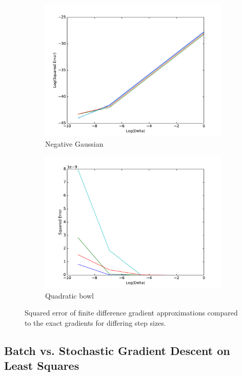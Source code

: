 \documentclass[psamsfonts]{amsart}
\theoremstyle{definition}
\theoremstyle{remark}
\numberwithin{equation}{section}
\begin{document}
\begin{figure}
\begin{subfigure}[b]{0.45\textwidth}
	\includegraphics[width=\textwidth]{hw1_1-2a.pdf}
	\caption{Negative Gaussian}
\end{subfigure}
\begin{subfigure}[b]{0.45\textwidth}
	\includegraphics[width=\textwidth]{hw1_1-2b.pdf}
	\caption{Quadratic bowl}
\end{subfigure}
\caption{Squared error of finite difference gradient approximations compared to the exact gradients for differing step sizes.}
\end{figure}

\subsection{Batch vs. Stochastic Gradient Descent on Least Squares}
\end{document}
